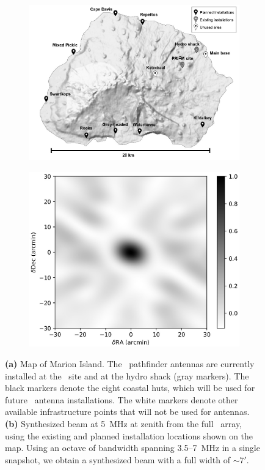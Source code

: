 \begin{figure}
	\centering
	\begin{subfigure}[t]{0.6\textwidth}
		\centering
		\includegraphics[width=\linewidth]{Figures/marion_map_annotated.jpg} 
		\caption{} \label{Fig:marion_map}
	\end{subfigure}
	\hfill
	\begin{subfigure}[t]{0.39\textwidth}
		\centering
		\includegraphics[width=\linewidth]{Figures/marion_beam_huts_2020.jpg}
		\caption{} \label{Fig:marion_beam}
	\end{subfigure}
	\caption{{\bf (a)} Map of Marion Island.  The
		\albatros\ pathfinder antennas are currently installed at the
		\prizm\ site and at the hydro shack (gray markers).  The black
		markers denote the eight coastal huts, which will be used for
		future \albatros\ antenna installations.  The white markers
		denote other available infrastructure points that will not be
		used for antennas. {\bf (b)} Synthesized beam at 5~MHz at zenith from the full \albatros\ array, using the existing and planned
		installation locations shown on the map.  Using an octave of
		bandwidth spanning 3.5--7~MHz in a single snapshot, we obtain a synthesized beam with a full width of $\sim7'$.}\label{Fig:marion_map_beam}
\end{figure}

